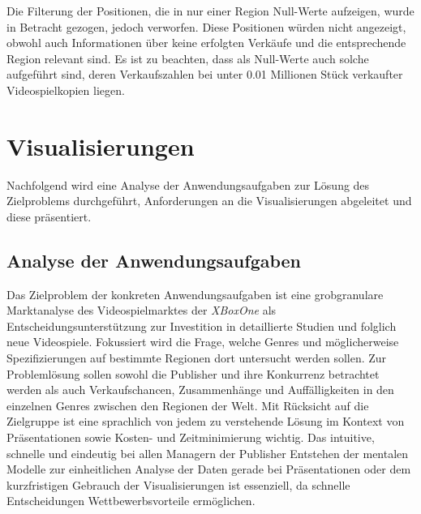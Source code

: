 \documentclass[usegeometry=true]{scrartcl}
\begin{document}
Die Filterung der Positionen, die in nur einer Region Null-Werte aufzeigen, wurde in Betracht gezogen, jedoch verworfen.
Diese Positionen würden nicht angezeigt, obwohl auch Informationen über keine erfolgten Verkäufe und die entsprechende Region relevant sind. 
Es ist zu beachten, dass als Null-Werte auch solche aufgeführt sind, deren Verkaufszahlen bei unter 0.01 Millionen Stück verkaufter Videospielkopien liegen. 

\section{Visualisierungen}
Nachfolgend wird eine Analyse der Anwendungsaufgaben zur Lösung des Zielproblems durchgeführt, Anforderungen an die Visualisierungen abgeleitet und diese präsentiert.

\subsection{Analyse der Anwendungsaufgaben}
Das Zielproblem der konkreten Anwendungsaufgaben ist eine grobgranulare Marktanalyse des Videospielmarktes der \textit{XBoxOne} 
als Entscheidungsunterstützung zur Investition in detaillierte Studien und folglich neue Videospiele. 
Fokussiert wird die Frage, welche Genres und möglicherweise Spezifizierungen auf bestimmte Regionen dort untersucht werden sollen. 
Zur Problemlösung sollen sowohl die Publisher und ihre Konkurrenz betrachtet werden als auch Verkaufschancen, Zusammenhänge und Auffälligkeiten in den einzelnen Genres zwischen den Regionen der Welt. 
Mit Rücksicht auf die Zielgruppe ist eine sprachlich von jedem zu verstehende Lösung im Kontext von Präsentationen sowie Kosten- und Zeitminimierung wichtig. 
Das intuitive, schnelle und eindeutig bei allen Managern der Publisher Entstehen der mentalen Modelle zur 
einheitlichen Analyse der Daten gerade bei Präsentationen oder dem kurzfristigen Gebrauch der Visualisierungen ist essenziell, 
da schnelle Entscheidungen Wettbewerbsvorteile ermöglichen.
\end{document}
